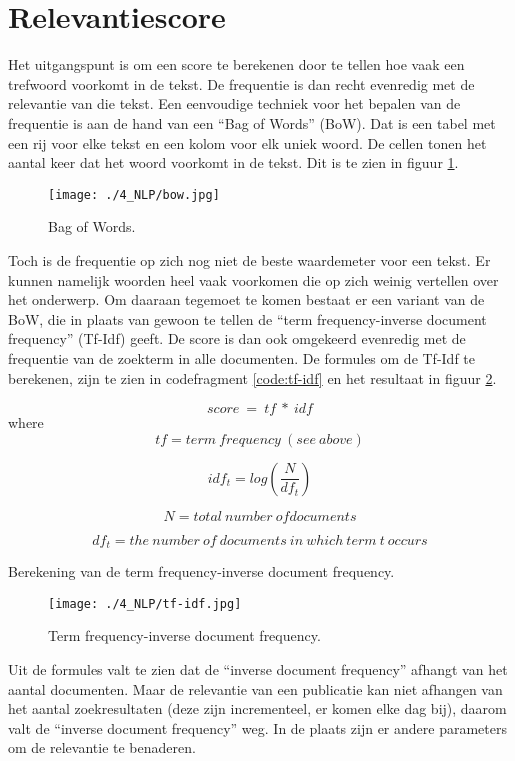 \section{Relevantiescore}
Het uitgangspunt is om een score te berekenen door te tellen hoe vaak een trefwoord voorkomt in de tekst. De frequentie is dan recht evenredig met de relevantie van die tekst. Een eenvoudige techniek voor het bepalen van de frequentie is aan de hand van een ``Bag of Words'' (BoW). Dat is een tabel met een rij voor elke tekst en een kolom voor elk uniek woord. De cellen tonen het aantal keer dat het woord voorkomt in de tekst.  Dit is te zien in figuur \ref{fig:bow}.
\begin{figure}[h!]
    \centering
    \texttt{[image: ./4\_NLP/bow.jpg]}
    \caption[Bag of Words.]{\label{fig:bow}Bag of Words.}
\end{figure}
Toch is de frequentie op zich nog niet de beste waardemeter voor een tekst. Er kunnen namelijk woorden heel vaak voorkomen die op zich weinig vertellen over het onderwerp. Om daaraan tegemoet te komen bestaat er een variant van de BoW, die in plaats van gewoon te tellen de ``term frequency-inverse document frequency'' (Tf-Idf) geeft. De score is dan ook omgekeerd evenredig met de frequentie van de zoekterm in alle documenten. De formules om de Tf-Idf te berekenen, zijn te zien in codefragment \ref{code:tf-idf} en het resultaat in figuur \ref{fig:tf-idf}.
\begin{listing}[h!]
    \[
        score\ =\ tf\ \ast\ idf
    \]  
    where
    \[
        tf=term\ frequency\ \left(see\ above\right)
    \] 
    
    \[
        idf_t=log\left(\frac{N}{df_t}\right)
    \]  
    
    \[ 
        N=total\ number\ ofdocuments
    \]  
    
    \[ 
        df_t=the\ number\ of\ documents\ in\ which\ term\ t\ occurs
    \] 
     
    \caption[term frequency-inverse document frequency]{Berekening van de term frequency-inverse document frequency.}
    \label{code:tf-idf}
\end{listing}
\begin{figure}[h!]
    \centering
    \texttt{[image: ./4\_NLP/tf-idf.jpg]}
    \caption[term frequency-inverse document frequency.]{\label{fig:tf-idf}Term frequency-inverse document frequency.}
\end{figure}
Uit de formules valt te zien dat de ``inverse document frequency'' afhangt van het aantal documenten. Maar de relevantie van een publicatie kan niet afhangen van het aantal zoekresultaten (deze zijn incrementeel, er komen elke dag bij), daarom valt de ``inverse document frequency'' weg. In de plaats zijn er andere parameters om de relevantie te benaderen.
